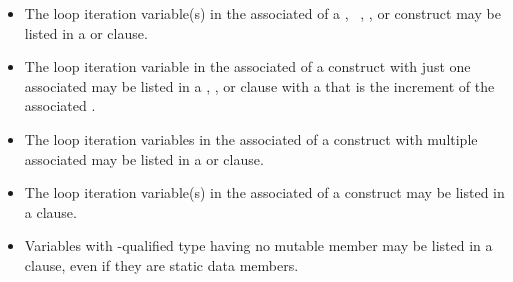 \begin{ccppspecific}
\begin{itemize}
\item The loop iteration variable(s) in the associated  of a ,
~, , or  construct may be listed in a  or  clause.

\item The loop iteration variable in the associated  of a  construct with just
one associated  may be listed in a ,
, or  clause with a
that is the increment of the associated .

\item The loop iteration variables in the associated  of a  construct with
multiple associated  may be listed in a  or  clause.

\item The loop iteration variable(s) in the associated  of a 
construct may be listed in a  clause.

\item Variables with -qualified type having no mutable member may be listed in a
 clause, even if they are static data members.
\end{itemize}
\end{ccppspecific}
%
